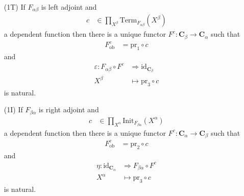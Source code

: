 \begin{lem}
\label{lem:adjointto}
\begin{enumerate}
\item[(1T)]
If $F_{\alpha\beta}$ is left adjoint and 
\begin{align*}
  c
  &\in
  \prod_{X^{\beta}}
  \mathrm{Term}_{F_{\alpha\beta}}(X^{\beta})
\end{align*}
a dependent function then there is a unique functor $F^{c} \colon \mathbf{C}_{\beta} \rightarrow \mathbf{C}_{\alpha}$ such that
\begin{align*}
  F_{\mathrm{ob}}^{c}
  &=
  \mathrm{pr}_{1}
  \circ
  c
\end{align*}
and
\begin{align*}
  \varepsilon
  \colon
  F_{\alpha\beta}
  \circ
  F^{c}
  &\Rightarrow
  \mathrm{id}_{\mathbf{C}_{\beta}}
  \\
  X^{\beta}
  &\mapsto
  \mathrm{pr}_{3}
  \circ
  c
\end{align*}
is natural.
\item[(1I)]
If $F_{\beta\alpha}$ is right adjoint and 
\begin{align*}
  c
  &\in
  \prod_{X^{\alpha}}
  \mathrm{Init}_{F_{\beta\alpha}}(X^{\alpha})
\end{align*}
a dependent function then there is a unique functor $F^{c} \colon \mathbf{C}_{\alpha} \rightarrow \mathbf{C}_{\beta}$ such that
\begin{align*}
  F_{\mathrm{ob}}^{c}
  &=
  \mathrm{pr}_{2}
  \circ
  c
\end{align*}
and
\begin{align*}
  \eta
  \colon
  \mathrm{id}_{\mathbf{C}_{\alpha}}
  &\Rightarrow
  F_{\beta\alpha}
  \circ
  F^{c}
  \\
  X^{\alpha}
  &\mapsto
  \mathrm{pr}_{3}
  \circ
  c
\end{align*}
is natural.
\end{enumerate}
\end{lem}
